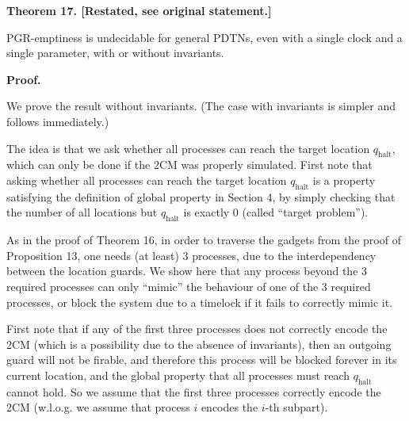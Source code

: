 \par\medskip\noindent\textbf{Theorem 17. [Restated, see original statement.]}\par
 
 
PGR-emptiness is undecidable for general PDTNs, even with a single clock and a single parameter, with or without invariants.\par
 
 
 
 
 
\par\medskip\noindent\textbf{Proof.}\par
 
 
We prove the result without invariants. (The case with invariants is simpler and follows immediately.)\par
 
 
 
The idea is that we ask whether all processes can reach the target location $q_{\textrm{halt}}$, which can only be done if the 2CM was properly simulated. First note that asking whether all processes can reach the target location $q_{\textrm{halt}}$ is a property satisfying the definition of global property in Section 4, by simply checking that the number of all locations but $q_{\textrm{halt}}$ is exactly 0 (called “target problem”).\par
 
 
 
As in the proof of Theorem 16, in order to traverse the gadgets from the proof of Proposition 13, one needs (at least) 3 processes, due to the interdependency between the location guards. We show here that any process beyond the 3 required processes can only “mimic” the behaviour of one of the 3 required processes, or block the system due to a timelock if it fails to correctly mimic it.\par
 
 
 
First note that if any of the first three processes does not correctly encode the 2CM (which is a possibility due to the absence of invariants), then an outgoing guard will not be firable, and therefore this process will be blocked forever in its current location, and the global property that all processes must reach $q_{\textrm{halt}}$ cannot hold. So we assume that the first three processes correctly encode the 2CM (w.l.o.g. we assume that process $i$ encodes the $i$-th subpart).\par
 

